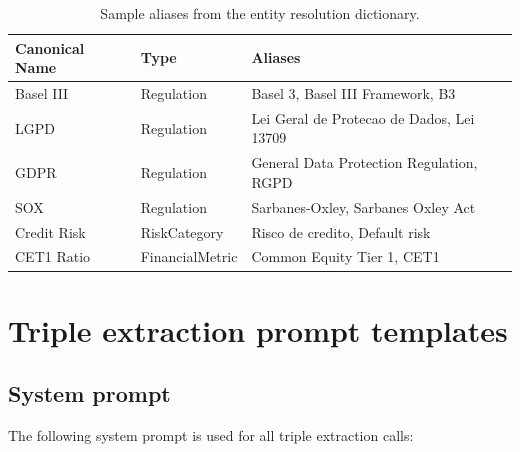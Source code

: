 \documentclass[review]{elsarticle}
\begin{document}
\begin{table}[ht]
\caption{Sample aliases from the entity resolution dictionary.}
\label{tab:aliases-sample}
\centering
\small
\begin{tabular}{@{}llp{5cm}@{}}
\toprule
\textbf{Canonical Name} & \textbf{Type} & \textbf{Aliases} \\
\midrule
Basel III & Regulation & Basel 3, Basel III Framework, B3 \\
LGPD & Regulation & Lei Geral de Protecao de Dados, Lei 13709 \\
GDPR & Regulation & General Data Protection Regulation, RGPD \\
SOX & Regulation & Sarbanes-Oxley, Sarbanes Oxley Act \\
Credit Risk & RiskCategory & Risco de credito, Default risk \\
CET1 Ratio & FinancialMetric & Common Equity Tier 1, CET1 \\
\bottomrule
\end{tabular}
\end{table}


\section{Triple extraction prompt templates}
\label{app:prompts}

\subsection{System prompt}

The following system prompt is used for all triple extraction calls:
\end{document}
